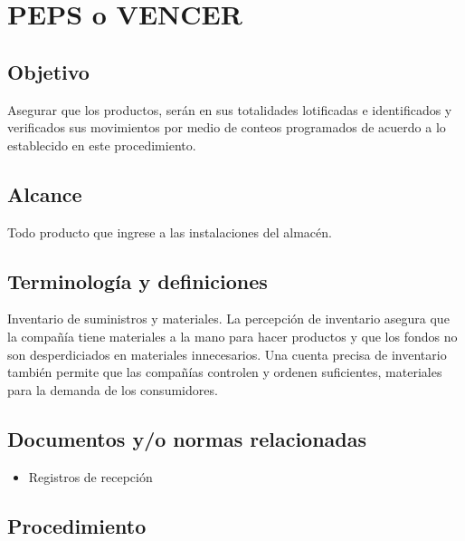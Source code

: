 \renewcommand{\MayorVer}{2}
\renewcommand{\MenorVer}{1}
\renewcommand{\Codigo}{PSA-1-PROG}
\renewcommand{\FechaPub}{2023--01}
\renewcommand{\Titulo}{PEPS o VENCER}

\section{\Titulo}


\subsection{Objetivo}
Asegurar que los productos, serán en sus totalidades lotificadas e identificados y verificados sus movimientos por medio de conteos programados de acuerdo a lo establecido en este procedimiento.

\subsection{Alcance}
Todo producto que ingrese a las instalaciones del almacén.

\subsection{Terminología y definiciones}
Inventario de suministros y materiales. La percepción de inventario asegura que la compañía tiene materiales a la mano para hacer productos y que los fondos no son desperdiciados en materiales innecesarios. Una cuenta precisa de inventario también permite que las compañías controlen y ordenen suficientes, materiales para la demanda de los consumidores.

\subsection{Documentos y/o normas relacionadas}
\begin{itemize}
	\item Registros de recepción
\end{itemize}

\subsection{Procedimiento}

